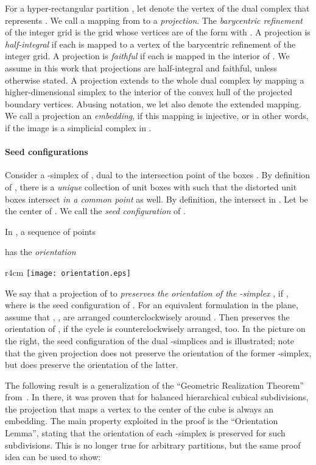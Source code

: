 \documentclass[12pt]{article}
\begin{document}
For a hyper-rectangular partition , let  denote
the vertex of the dual complex  that represents . We call a mapping from
 to  a \emph{projection}. 
The \emph{barycentric refinement} of the integer grid is the grid whose vertices
are of the form  with .
A projection is \emph{half-integral} if each  is mapped to a vertex of the barycentric
refinement of the integer grid.
A projection is \emph{faithful} if each  is mapped in the interior of .
We assume in this work that projections are half-integral and faithful, unless otherwise stated.
A projection  extends to the whole dual complex  by mapping a higher-dimensional simplex
to the interior of the convex hull of the projected boundary vertices. 
Abusing notation, we let  also denote the extended mapping.
We call a projection an \emph{embedding},
if this mapping is injective, or in other words, if the image 
is a simplicial complex in . 

\paragraph{Seed configurations}
Consider a -simplex  of , dual to the intersection point 
of the boxes .
By definition of , there is a \emph{unique} collection of unit boxes
 with  such that the distorted
unit boxes  intersect \emph{in a common point} as well.
By definition, the  intersect in .
Let  be the center of . We call 
the \emph{seed configuration} of .

In , a sequence of  points
 
has the \emph{orientation} 

\begin{wrapfigure}[10]{r}{4cm}
\vspace{-0.3cm}
\texttt{[image: orientation.eps]}
\end{wrapfigure}
We say that a projection  of  to  \emph{preserves the orientation
of the -simplex }, if ,
where  is the seed configuration of .
For an equivalent formulation in the plane, assume that , ,  are arranged 
counterclockwisely
around . Then  preserves the orientation of , if the cycle
 is counterclockwisely arranged, too.
In the picture on the right, the seed configuration of the dual -simplices 
 and  is illustrated; note that the given projection
does not preserve the orientation of the former -simplex, but does preserve the orientation of the latter.

The following result is a generalization of the ``Geometric Realization Theorem''
from~\cite{ek-freudenthal}. In there, it was proven that for balanced hierarchical cubical subdivisions,
the projection that maps a vertex to the center of the cube is always an embedding. The main property
exploited in the proof is the ``Orientation Lemma'', stating that the orientation of each -simplex
is preserved for such subdivisions. This is no longer true for arbitrary partitions, but the same
proof idea can be used to show:
\end{document}
